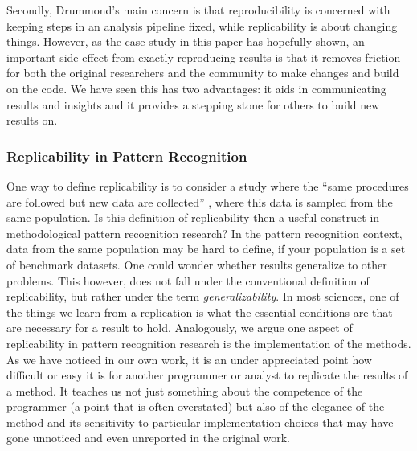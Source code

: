 \documentclass[runningheads,a4paper]{llncs}\usepackage[]{graphicx}\usepackage[]{color}
\begin{document}
Secondly, Drummond's main concern is that reproducibility is concerned with keeping steps in an analysis pipeline fixed, while replicability is about changing things. However, as the case study in this paper has hopefully shown, an important side effect from exactly reproducing results is that it removes friction for both the original researchers and the community to make changes and build on the code. We have seen this has two advantages: it aids in communicating results and insights and it provides a stepping stone for others to build new results on.

\subsubsection{Replicability in Pattern Recognition}
One way to define replicability is to consider a study where the ``same procedures are followed but new data are collected'' \cite{Goodman2016a}, where this data is sampled from the same population. Is this definition of replicability then a useful construct in methodological pattern recognition research? In the pattern recognition context, data from the same population may be hard to define, if your population is a set of benchmark datasets. One could wonder whether results generalize to other problems. This however, does not fall under the conventional definition of replicability, but rather under the term \emph{generalizability}. 
In most sciences, one of the things we learn from a replication is what the essential conditions are that are necessary for a result to hold. Analogously, we argue one aspect of replicability in pattern recognition research is the implementation of the methods. As we have noticed in our own work, it is an under appreciated point how difficult or easy it is for another programmer or analyst to replicate the results of a method. It teaches us not just something about the competence of the programmer (a point that is often overstated) but also of the elegance of the method and its sensitivity to particular implementation choices that may have gone unnoticed and even unreported in the original work.
\end{document}
